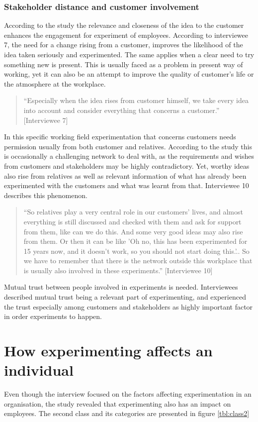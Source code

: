\subsubsection{Stakeholder distance and customer involvement}
According to the study the relevance and closeness of the idea to the customer enhances the engagement for experiment of employees. According to interviewee 7, the need for a change rising from a customer, improves the likelihood of the idea taken seriously and experimented. The same applies when a clear need to try something new is present. This is usually faced as a problem in present way of working, yet it can also be an attempt to improve the quality of customer's life or the atmosphere at the workplace.  
\begin{quote}
 ``Especially when the idea rises from customer himself, we take every idea into account and consider everything that concerns a customer.'' [Interviewee 7]
\end{quote}
In this specific working field experimentation that concerns customers needs permission usually from both customer and relatives. According to the study this is occasionally a challenging network to deal with, as the requirements and wishes from customers and stakeholders may be highly contradictory. Yet, worthy ideas also rise from relatives as well as relevant information of what has already been experimented with the customers and what was learnt from that. Interviewee 10 describes this phenomenon. 
\begin{quote}
``So relatives play a very central role in our customers' lives, and almost everything is still discussed and checked with them and ask for support from them, like can we do this. And some very good ideas may also rise from them. Or then it can be like 'Oh no, this has been experimented for 15 years now, and it doesn't work, so you should not start doing this.'.. So we have to remember that there is the network outside this workplace that is usually also involved in these experiments.'' [Interviewee 10]
\end{quote}
Mutual trust between people involved in experiments is needed. Interviewees described mutual trust being a relevant part of experimenting, and experienced the trust especially among customers and stakeholders as highly important factor in order experiments to happen. 

\section{How experimenting affects an individual}
Even though the interview focused on the factors affecting experimentation in an organisation, the study revealed that experimenting also has an impact on employees. The second class and its categories are presented in figure \ref{tbl:class2}

